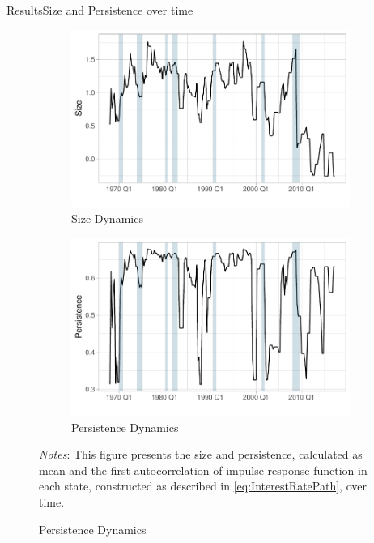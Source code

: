 \documentclass[11pt,pdf,aspectratio=129]{beamer}
\begin{document}
\begin{frame}{Results}{Size and Persistence over time}
    \begin{figure}[!htbp]\centering
        \vspace{-2ex}
        \label{fig:Size_Persistence_Dynamics}
        \begin{subfigure}[b]{0.49\textwidth}
            \centering
            \caption{Size Dynamics}
            \label{fig:AverageResponce}
            \includegraphics[width=\linewidth]{size_plot.pdf}
        \end{subfigure}
        \hfill
        \begin{subfigure}[b]{0.49\textwidth}
            \centering
            \caption{Persistence Dynamics}
            \label{fig:DifferentialResponce}
            \includegraphics[width=\linewidth]{persistence_plot.pdf}
        \end{subfigure} \vspace{-5ex}
            {\begin{flushleft}\tiny\textit{Notes}: This figure presents the size and persistence, calculated as mean and the first autocorrelation of impulse-response function in each state, constructed as described in \vref{eq:InterestRatePath}, over time. \end{flushleft}}
      \end{figure}
      
\end{frame}
\end{document}
